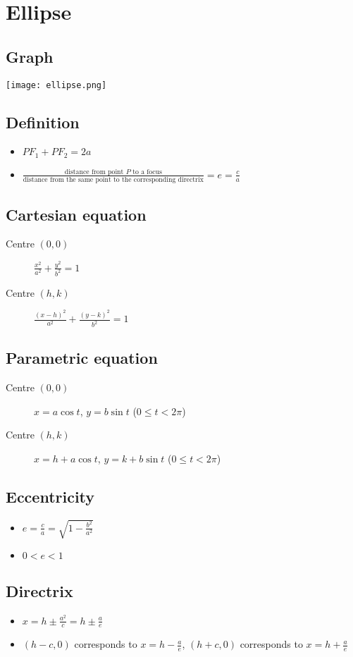 \section{Ellipse}
\subsection{Graph}
\texttt{[image: ellipse.png]}
\subsection{Definition}
\begin{itemize}
    \item $PF_1 + PF_2 = 2a$
    \item $\frac{\text{distance from point $P$ to a focus}}{\text{distance from the same point to the corresponding directrix}}=e=\frac{c}{a}$
\end{itemize}
\subsection{Cartesian equation}
\begin{description}
    \item[Centre $(0,0)$] $\frac{x^2}{a^2}+\frac{y^2}{b^2}=1$
    \item[Centre $(h,k)$] $\frac{(x-h)^2}{a^2}+\frac{(y-k)^2}{b^2}=1$
\end{description}
\subsection{Parametric equation}
\begin{description}
    \item[Centre $(0,0)$] $x=a\cos t$, $y=b\sin t$ ($0\leq t < 2\pi$)
    \item[Centre $(h,k)$] $x=h+a\cos t$, $y=k+b\sin t$ ($0\leq t < 2\pi$)
\end{description}
\subsection{Eccentricity}
\begin{itemize}
    \item $e=\frac{c}{a}=\sqrt{1-\frac{b^2}{a^2}}$
    \item $0<e<1$
\end{itemize}
\subsection{Directrix}
\begin{itemize}
    \item $x=h\pm \frac{a^2}{c} = h\pm\frac{a}{e}$
    \item $(h-c, 0)$ corresponds to $x=h-\frac{a}{e}$, $(h+c, 0)$ corresponds to $x=h+\frac{a}{e}$
\end{itemize}
